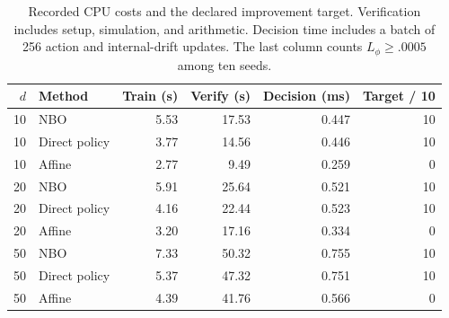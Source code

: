 \begin{table}[htbp]\centering\small\setlength{\tabcolsep}{4pt}
\caption{Recorded CPU costs and the declared improvement target. Verification includes setup, simulation, and arithmetic. Decision time includes a batch of 256 action and internal-drift updates. The last column counts $L_\phi\geq.0005$ among ten seeds.}\label{tab:r11cost}
\begin{tabular}{rlrrrr}\toprule
$d$ & Method & Train (s) & Verify (s) & Decision (ms) & Target / 10\\\midrule
10 & NBO & 5.53 & 17.53 & 0.447 & 10 \\
10 & Direct policy & 3.77 & 14.56 & 0.446 & 10 \\
10 & Affine & 2.77 & 9.49 & 0.259 & 0 \\
20 & NBO & 5.91 & 25.64 & 0.521 & 10 \\
20 & Direct policy & 4.16 & 22.44 & 0.523 & 10 \\
20 & Affine & 3.20 & 17.16 & 0.334 & 0 \\
50 & NBO & 7.33 & 50.32 & 0.755 & 10 \\
50 & Direct policy & 5.37 & 47.32 & 0.751 & 10 \\
50 & Affine & 4.39 & 41.76 & 0.566 & 0 \\
\bottomrule\end{tabular}\end{table}
